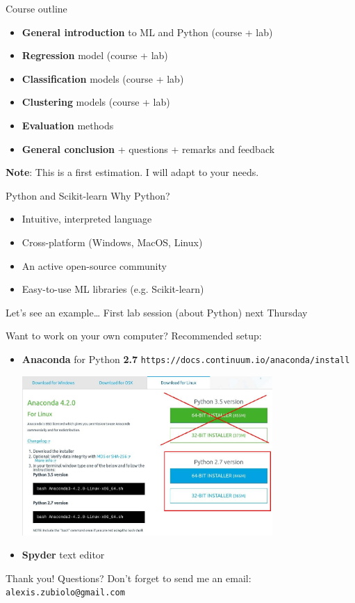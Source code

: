 \documentclass{beamer}
\begin{document}
\begin{frame}{Course outline}
\vfill
\begin{itemize}
  \item \textbf{General introduction} to ML and Python (course + lab)
  \item \textbf{Regression} model (course + lab)
  \item \textbf{Classification} models (course + lab)
  \item \textbf{Clustering} models (course + lab)
  \item \textbf{Evaluation} methods
  \item \textbf{General conclusion} + questions + remarks and feedback
\end{itemize}
\vfill
\textbf{Note}: This is a first estimation. I will adapt to your needs.
\end{frame}

\begin{frame}{Python and Scikit-learn}
\vfill
Why Python?
\vfill
\begin{itemize}
	\item Intuitive, interpreted language
	\item Cross-platform (Windows, MacOS, Linux)
	\item An active open-source community
	\item Easy-to-use ML libraries (e.g. Scikit-learn)
\end{itemize}
\vfill
Let's see an example\ldots
\vfill
First lab session (about Python) next Thursday
\vfill
\end{frame}

\begin{frame}{Want to work on your own computer?}
\vfill
Recommended setup:
\vfill
\begin{itemize}
	\item \textbf{Anaconda} for Python \textbf{2.7}
	\newline \texttt{https://docs.continuum.io/anaconda/install}
\begin{center}
\includegraphics[width=0.75\textwidth]{images/anaconda_download.jpg}
\end{center}
	\item \textbf{Spyder} text editor
\end{itemize}
\vfill
\end{frame}

\begin{frame}
\vfill
\centering
\huge{Thank you! Questions?}
\vfill
Don't forget to send me an email: \texttt{alexis.zubiolo@gmail.com}
\vfill
\end{frame}
\end{document}
